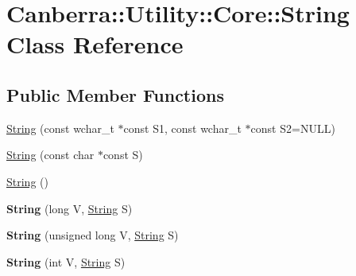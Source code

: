 \hypertarget{class_canberra_1_1_utility_1_1_core_1_1_string}{}\section{Canberra\+:\+:Utility\+:\+:Core\+:\+:String Class Reference}
\label{class_canberra_1_1_utility_1_1_core_1_1_string}
\subsection*{Public Member Functions}
\begin{DoxyCompactItemize}
\item 
\hyperlink{class_canberra_1_1_utility_1_1_core_1_1_string_a00d9926206b104343a1a234b66dd0f9b_a00d9926206b104343a1a234b66dd0f9b}{String} (const wchar\+\_\+t $\ast$const S1, const wchar\+\_\+t $\ast$const S2=N\+U\+LL)
\item 
\hyperlink{class_canberra_1_1_utility_1_1_core_1_1_string_aea095c5ed108309da77168c8d933c72e_aea095c5ed108309da77168c8d933c72e}{String} (const char $\ast$const S)
\item 
\hyperlink{class_canberra_1_1_utility_1_1_core_1_1_string_ab8ed4a495eaea8f65d7151289bd11cc0_ab8ed4a495eaea8f65d7151289bd11cc0}{String} ()
\item 
\mbox{\label{class_canberra_1_1_utility_1_1_core_1_1_string_a7e4ccae1f9c490907f55a590c2ffd777}} 
{\bfseries String} (long V, \hyperlink{class_canberra_1_1_utility_1_1_core_1_1_string}{String} S)
\item 
\mbox{\label{class_canberra_1_1_utility_1_1_core_1_1_string_a408b8f38e4ab31d29e1bc1dc4bab4e71}} 
{\bfseries String} (unsigned long V, \hyperlink{class_canberra_1_1_utility_1_1_core_1_1_string}{String} S)
\item 
\mbox{\label{class_canberra_1_1_utility_1_1_core_1_1_string_a9e5cf4bf405b9e8197fc01db4645ad67}} 
{\bfseries String} (int V, \hyperlink{class_canberra_1_1_utility_1_1_core_1_1_string}{String} S)
\item 
\mbox{\label{class_canberra_1_1_utility_1_1_core_1_1_string_a5f645ceed1fac8012c586e0775d655d7}} 

\end{DoxyCompactItemize}
